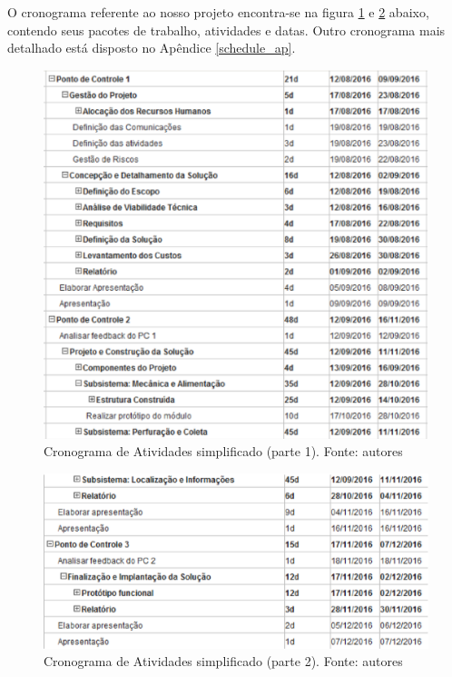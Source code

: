       O cronograma referente ao nosso projeto encontra-se na figura \ref{fig:cron_s1}
      e \ref{fig:cron_s2} abaixo, contendo seus pacotes de trabalho, atividades e datas. Outro
      cronograma mais detalhado está disposto no Apêndice \ref{schedule_ap}.

      \begin{figure}[!htbp]
        \centering
        \includegraphics[width=\textwidth]{figuras/cronograma_simples_1.eps}
        \caption{Cronograma de Atividades simplificado (parte 1). Fonte: autores}
        \label{fig:cron_s1}
      \end{figure}

      \clearpage

      \begin{figure}[!htbp]
        \centering
        \includegraphics[width=\textwidth]{figuras/cronograma_simples_2.eps}
        \caption{Cronograma de Atividades simplificado (parte 2). Fonte: autores}
        \label{fig:cron_s2}
      \end{figure}

      \vfill
      \pagebreak
